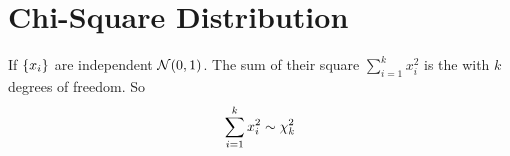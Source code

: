 \section{Chi-Square Distribution}

\begin{definition}
    If $\set{x_i}$ are independent $\mathcal{N}(0,1)$. The sum of their square $\sum_{i=1}^k x_i^2$ is the  with $k$ degrees of freedom. So
    \begin{equation}
        \sum_{i=1}^k x_i^2 \sim \chi^2_{k}
    \end{equation}
\end{definition}
























































































